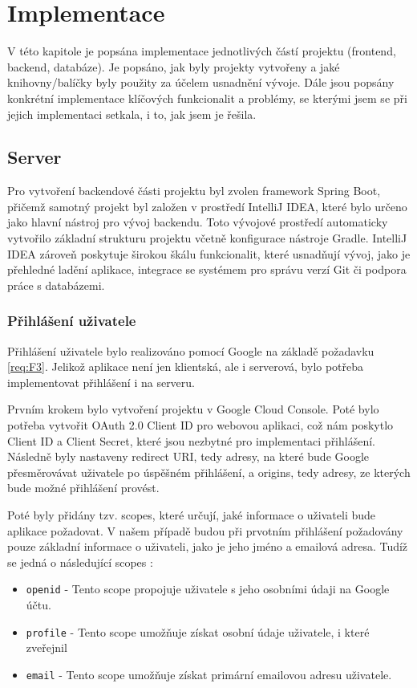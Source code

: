 \chapter{Implementace}
\begin{chapterabstract}
V této kapitole je popsána implementace jednotlivých částí projektu (frontend, backend, databáze). Je popsáno, jak byly projekty vytvořeny a jaké knihovny/balíčky byly použity za účelem usnadnění vývoje. Dále jsou popsány konkrétní implementace klíčových funkcionalit a problémy, se kterými jsem se při jejich implementaci setkala, i to, jak jsem je řešila.
\end{chapterabstract}

\section{Server}
Pro vytvoření backendové části projektu byl zvolen framework Spring Boot, přičemž samotný projekt byl založen v prostředí IntelliJ IDEA, které bylo určeno jako hlavní nástroj pro vývoj backendu. Toto vývojové prostředí automaticky vytvořilo základní strukturu projektu včetně konfigurace nástroje Gradle. IntelliJ IDEA zároveň poskytuje širokou škálu funkcionalit, které usnadňují vývoj, jako je přehledné ladění aplikace, integrace se systémem pro správu verzí Git či podpora práce s databázemi. \cite{jetbrains_idea_features}

\subsection{Přihlášení uživatele}
Přihlášení uživatele bylo realizováno pomocí Google na základě požadavku \ref{req:F3}. Jelikož aplikace není jen klientská, ale i serverová, bylo potřeba implementovat přihlášení i na serveru.

Prvním krokem bylo vytvoření projektu v Google Cloud Console. Poté bylo potřeba vytvořit OAuth 2.0 Client ID pro webovou aplikaci, což nám poskytlo Client ID a Client Secret, které jsou nezbytné pro implementaci přihlášení. Následně byly nastaveny redirect URI, tedy adresy, na které bude Google přesměrovávat uživatele po úspěšném přihlášení, a origins, tedy adresy, ze kterých bude možné přihlášení provést. \cite{google_oauth_cred}

Poté byly přidány tzv. scopes, které určují, jaké informace o uživateli bude aplikace požadovat. V našem případě budou při prvotním přihlášení požadovány pouze základní informace o uživateli, jako je jeho jméno a emailová adresa. Tudíž se jedná o následující scopes \cite{google_oauth_scopes}:
\begin{itemize}
    \item \texttt{openid} - Tento scope propojuje uživatele s jeho osobními údaji na Google účtu.
    \item \texttt{profile} - Tento scope umožňuje získat osobní údaje uživatele, i které zveřejnil
    \item \texttt{email} - Tento scope umožňuje získat primární emailovou adresu uživatele.
\end{itemize} 

